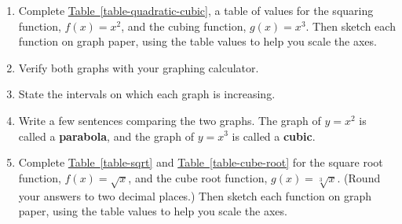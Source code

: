 \documentclass[10pt,]{book}
\newcommand{\terminology}[1]{\textbf{#1}}
\theoremstyle{plain}
\theoremstyle{definition}
\theoremstyle{definition}
\numberwithin{equation}{section}
\begin{document}
\begin{enumerate}
\item\hypertarget{li-259}{}Complete \hyperref[table-quadratic-cubic]{Table~\ref{table-quadratic-cubic}}, a table of values for the squaring function, \(f (x) = x^2\), and the cubing function, \(g(x) = x^3\). Then sketch each function on graph paper, using the table values to help you scale the axes.\item\hypertarget{li-260}{}Verify both graphs with your graphing calculator.\item\hypertarget{li-261}{}State the intervals on which each graph is increasing.\item\hypertarget{li-262}{}Write a few sentences comparing the two graphs. The graph of \(y = x^2\) is called a \terminology{parabola}, and the graph of \(y = x^3\) is called a \terminology{cubic}.\item\hypertarget{li-263}{}Complete \hyperref[table-sqrt]{Table~\ref{table-sqrt}} and \hyperref[table-cube-root]{Table~\ref{table-cube-root}} for the square root function, \(f (x) = \sqrt{x}\), and the cube root function, \(g(x) = \sqrt[3]{x} \). (Round your answers to two decimal places.) Then sketch each function on graph paper, using the table values to help you scale the axes.


\end{enumerate}
\end{document}
